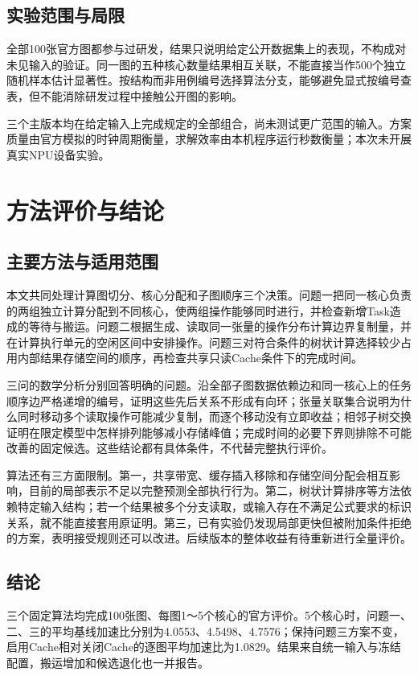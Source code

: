 \documentclass[anonymous,notoc]{gmcm2026}
\begin{document}
\subsection{实验范围与局限}

全部100张官方图都参与过研发，结果只说明给定公开数据集上的表现，不构成对未见输入的验证。同一图的五种核心数量结果相互关联，不能直接当作500个独立随机样本估计显著性。按结构而非用例编号选择算法分支，能够避免显式按编号查表，但不能消除研发过程中接触公开图的影响。

三个主版本均在给定输入上完成规定的全部组合，尚未测试更广范围的输入。方案质量由官方模拟的时钟周期衡量，求解效率由本机程序运行秒数衡量；本次未开展真实NPU设备实验。


\section{方法评价与结论}

\subsection{主要方法与适用范围}

本文共同处理计算图切分、核心分配和子图顺序三个决策。问题一把同一核心负责的两组独立计算分配到不同核心，使两组操作能够同时进行，并检查新增Task造成的等待与搬运。问题二根据生成、读取同一张量的操作分布计算边界复制量，并在计算执行单元的空闲区间中安排操作。问题三对符合条件的树状计算选择较少占用内部结果存储空间的顺序，再检查共享只读Cache条件下的完成时间。

三问的数学分析分别回答明确的问题。沿全部子图数据依赖边和同一核心上的任务顺序边严格递增的编号，证明这些先后关系不形成有向环；张量关联集合说明为什么同时移动多个读取操作可能减少复制，而逐个移动没有立即收益；相邻子树交换证明在限定模型中怎样排列能够减小存储峰值；完成时间的必要下界则排除不可能改善的固定候选。这些结论都有具体条件，不代替完整执行评价。

算法还有三方面限制。第一，共享带宽、缓存插入移除和存储空间分配会相互影响，目前的局部表示不足以完整预测全部执行行为。第二，树状计算排序等方法依赖特定输入结构；若一个结果被多个分支读取，或输入存在不满足公式要求的标识关系，就不能直接套用原证明。第三，已有实验仍发现局部更快但被附加条件拒绝的方案，表明接受规则还可以改进。后续版本的整体收益有待重新进行全量评价。

\subsection{结论}

三个固定算法均完成100张图、每图1～5个核心的官方评价。5个核心时，问题一、二、三的平均基线加速比分别为4.0553、4.5498、4.7576；保持问题三方案不变，启用Cache相对关闭Cache的逐图平均加速比为1.0829。结果来自统一输入与冻结配置，搬运增加和候选退化也一并报告。
\end{document}
